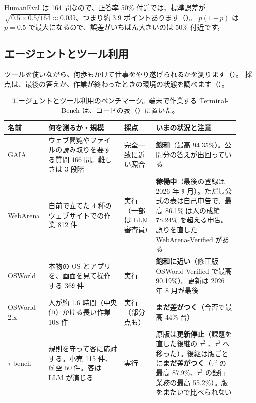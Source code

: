HumanEval は 164 問なので、正答率 50\% 付近では、標準誤差が $\sqrt{0.5\times0.5/164}\approx0.039$、つまり約 3.9 ポイントあります（）。
$p(1-p)$ は $p=0.5$ で最大になるので、誤差がいちばん大きいのは 50\% 付近です。

\subsection{エージェントとツール利用}\label{sec:bm-agent}

ツールを使いながら、何歩もかけて仕事をやり遂げられるかを測ります（）。
採点は、最後の答えか、作業が終わったときの環境の状態を調べます（）。

\begin{table}[htbp]
\centering\small\setlength{\tabcolsep}{4pt}
\caption{エージェントとツール利用のベンチマーク。端末で作業する Terminal-Bench は、コードの表（）に置いた。}
\label{tab:bm-agent}
\begin{tabular}{@{}>{\raggedright\arraybackslash}p{0.15\linewidth}>{\raggedright\arraybackslash}p{0.31\linewidth}>{\raggedright\arraybackslash}p{0.13\linewidth}>{\raggedright\arraybackslash}p{0.34\linewidth}@{}}
\toprule
名前 & 何を測るか・規模 & 採点 & いまの状況と注意 \\
\midrule
GAIA \cite{mialon2024gaia} & ウェブ閲覧やファイルの読み取りを要する質問 466 問。難しさは 3 段階 & 完全一致に近い照合 & \textbf{飽和}（最高 94.35\%）。公開分の答えが出回っている \\
\addlinespace[0.2em]
WebArena \cite{zhou2024webarena} & 自前で立てた 4 種のウェブサイトでの作業 812 件 & 実行（一部は LLM 審査員） & \textbf{稼働中}（最後の登録は 2026 年 9 月）。ただし公式の表は自己申告で、最高 86.1\% は人の成績 78.24\% を超える申告。誤りを直した WebArena-Verified がある \\
\addlinespace[0.2em]
OSWorld \cite{xie2024osworld} & 本物の OS とアプリを、画面を見て操作する 369 件 & 実行 & \textbf{飽和に近い}（修正版 OSWorld-Verified \cite{xlang2025osworldverified} で最高 90.19\%）。更新は 2026 年 8 月が最後 \\
\addlinespace[0.2em]
OSWorld 2.x \cite{yuan2026osworld2} & 人が約 1.6 時間（中央値）かける長い作業 108 件 & 実行（部分点も） & \textbf{まだ差がつく}（合否で最高 44\% 台） \\
\addlinespace[0.2em]
$\tau$-bench \cite{yao2025taubench} & 規則を守って客に応対する。小売 115 件、航空 50 件。客は LLM が演じる & 実行 & 原版は\textbf{更新停止}（課題を直した後継の $\tau^2$ \cite{barres2025tau2bench}、$\tau^3$ へ移った）。後継は版ごとに\textbf{まだ差がつく}（$\tau^2$ の最高 87.9\%、$\tau^3$ の銀行業務の最高 55.2\%）。版をまたいで比べられない \\

\end{tabular}
\end{table}
